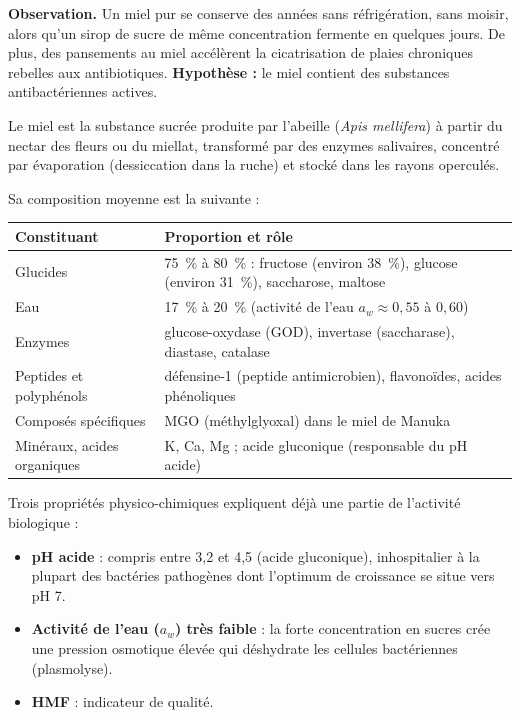 \documentclass[11pt]{article}
\newcommand{\cle}[1]{{\popxbold\color{popdark}#1}}
\begin{document}
\textbf{Observation.} Un miel pur se conserve des années sans réfrigération, sans moisir, alors qu'un sirop de sucre de même concentration fermente en quelques jours. De plus, des pansements au miel accélèrent la cicatrisation de plaies chroniques rebelles aux antibiotiques. \textbf{Hypothèse :} le miel contient des substances antibactériennes actives.

\begin{definition}[Miel]
Le miel est la substance sucrée produite par l'abeille (\emph{Apis mellifera}) à partir du nectar des fleurs ou du miellat, transformé par des enzymes salivaires, concentré par évaporation (dessiccation dans la ruche) et stocké dans les rayons operculés.
\end{definition}

Sa composition moyenne est la suivante :

\begin{center}
\begin{tabularx}{\linewidth}{|l|X|}\hline
\rowcolor{popblueL} \textbf{Constituant} & \textbf{Proportion et rôle} \\ \hline
Glucides & \SI{75}{\percent} à \SI{80}{\percent} : fructose (environ \SI{38}{\percent}), glucose (environ \SI{31}{\percent}), saccharose, maltose \\ \hline
Eau & \SI{17}{\percent} à \SI{20}{\percent} (activité de l'eau $a_w \approx 0,55$ à $0,60$) \\ \hline
Enzymes & \cle{glucose-oxydase} (GOD), \cle{invertase} (saccharase), diastase, catalase \\ \hline
Peptides et polyphénols & \cle{défensine-1} (peptide antimicrobien), flavonoïdes, acides phénoliques \\ \hline
Composés spécifiques & \cle{MGO} (méthylglyoxal) dans le miel de Manuka \\ \hline
Minéraux, acides organiques & K, Ca, Mg ; acide gluconique (responsable du pH acide) \\ \hline
\end{tabularx}
\end{center}

Trois propriétés physico-chimiques expliquent déjà une partie de l'activité biologique :

\begin{itemize}
\item \textbf{pH acide} : compris entre 3,2 et 4,5 (acide gluconique), inhospitalier à la plupart des bactéries pathogènes dont l'optimum de croissance se situe vers pH 7.
\item \textbf{Activité de l'eau ($a_w$) très faible} : la forte concentration en sucres crée une pression osmotique élevée qui déshydrate les cellules bactériennes (plasmolyse).
\item \textbf{HMF} : indicateur de qualité.
\end{itemize}
\end{document}
